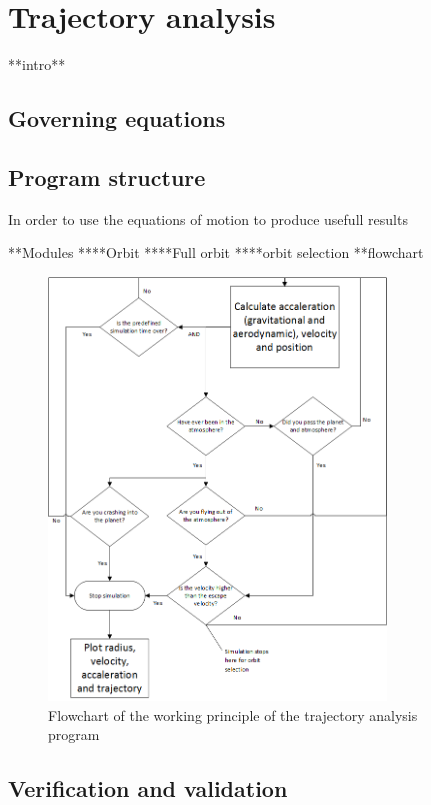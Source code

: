 \section{Trajectory analysis} \label{ch:trajectory}

**intro**

\subsection{Governing equations}\label{sec:gov}

\subsection{Program structure}\label{sec:prog_struct}

In order to use the equations of motion to produce usefull results

**Modules
****Orbit
****Full orbit
****orbit selection
**flowchart
\begin{figure}[H]
\hspace{-23mm}
\includegraphics[width = 0.8\textwidth]{Figure/astro_tool.png}
\vspace{-5mm}
\caption{Flowchart of the working principle of the trajectory analysis program}
\label{fig:traj_flow}
\end{figure}


\subsection{Verification and validation}